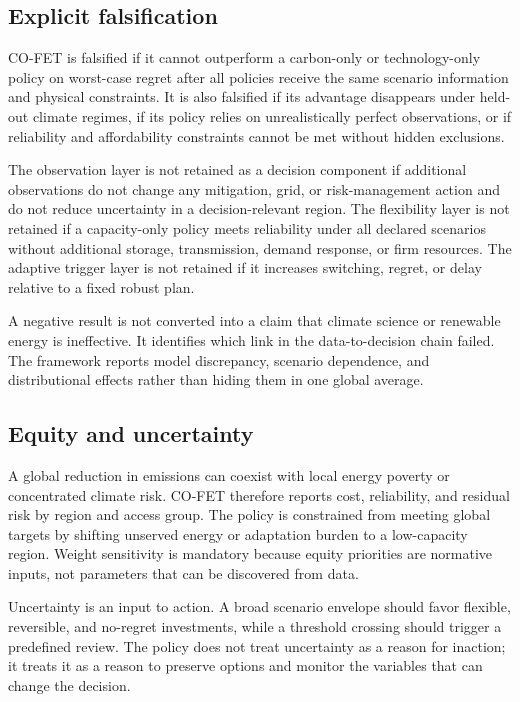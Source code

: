 \documentclass[conference]{IEEEtran}
\begin{document}
\subsection{Explicit falsification}
CO-FET is falsified if it cannot outperform a carbon-only or technology-only policy on worst-case regret after all policies receive the same scenario information and physical constraints. It is also falsified if its advantage disappears under held-out climate regimes, if its policy relies on unrealistically perfect observations, or if reliability and affordability constraints cannot be met without hidden exclusions.

The observation layer is not retained as a decision component if additional observations do not change any mitigation, grid, or risk-management action and do not reduce uncertainty in a decision-relevant region. The flexibility layer is not retained if a capacity-only policy meets reliability under all declared scenarios without additional storage, transmission, demand response, or firm resources. The adaptive trigger layer is not retained if it increases switching, regret, or delay relative to a fixed robust plan.

A negative result is not converted into a claim that climate science or renewable energy is ineffective. It identifies which link in the data-to-decision chain failed. The framework reports model discrepancy, scenario dependence, and distributional effects rather than hiding them in one global average.

\subsection{Equity and uncertainty}
A global reduction in emissions can coexist with local energy poverty or concentrated climate risk. CO-FET therefore reports cost, reliability, and residual risk by region and access group. The policy is constrained from meeting global targets by shifting unserved energy or adaptation burden to a low-capacity region. Weight sensitivity is mandatory because equity priorities are normative inputs, not parameters that can be discovered from data.

Uncertainty is an input to action. A broad scenario envelope should favor flexible, reversible, and no-regret investments, while a threshold crossing should trigger a predefined review. The policy does not treat uncertainty as a reason for inaction; it treats it as a reason to preserve options and monitor the variables that can change the decision.
\end{document}
